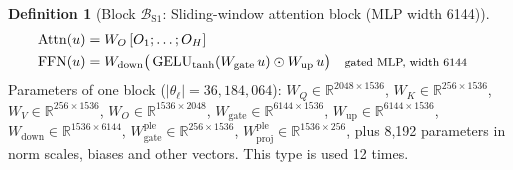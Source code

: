 \documentclass[10pt,a4paper]{article}
\newcommand{\op}[1]{\operatorname{#1}}
\theoremstyle{definition}
\newtheorem{definition}{Definition}[section]
\begin{document}
\begin{definition}[Block $\mathcal{B}_{\mathrm{S1}}$: Sliding-window attention block (MLP width 6144)]
\begin{align*}
  \op{Attn}(u) &= W_O\,[O_1;\dots;O_H] \\
  \op{FFN}(u) &= W_{\mathrm{down}}\big(\op{GELU}_{\tanh}(W_{\mathrm{gate}}\,u)\odot W_{\mathrm{up}}\,u\big) && \text{\footnotesize gated MLP, width 6144}
\end{align*}
Parameters of one block ($|\theta_\ell|=36{,}184{,}064$): $W_Q\in\mathbb{R}^{2048\times1536}$, $W_K\in\mathbb{R}^{256\times1536}$, $W_V\in\mathbb{R}^{256\times1536}$, $W_O\in\mathbb{R}^{1536\times2048}$, $W_{\mathrm{gate}}\in\mathbb{R}^{6144\times1536}$, $W_{\mathrm{up}}\in\mathbb{R}^{6144\times1536}$, $W_{\mathrm{down}}\in\mathbb{R}^{1536\times6144}$, $W^{\mathrm{ple}}_{\mathrm{gate}}\in\mathbb{R}^{256\times1536}$, $W^{\mathrm{ple}}_{\mathrm{proj}}\in\mathbb{R}^{1536\times256}$, plus 8,192 parameters in norm scales, biases and other vectors. This type is used 12 times.
\end{definition}
\end{document}
